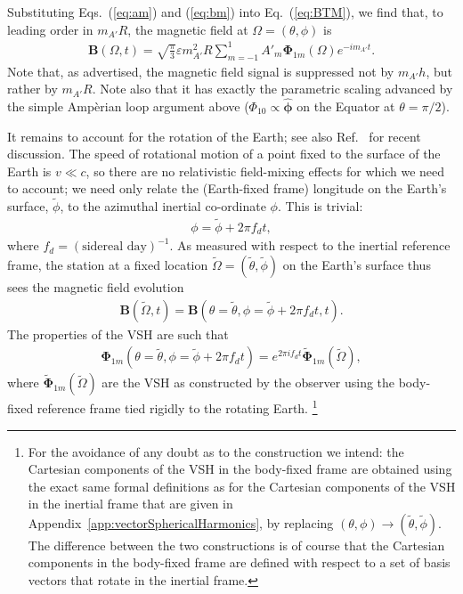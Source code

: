 \documentclass[amsmath,amssymb,aps,10pt,prd,letterpaper,nofootinbib,balancelastpage,notitlepage,superscriptaddress,twocolumn,floatfix]{revtex4-2}
\newcommand{\appref}[2][x]{Appendi{#1}~\ref{#2}}	%
\renewcommand{\eqref}[2][]{Eq{#1}.~(\ref{eq:#2})}	%
\newcommand{\citeR}[2][]{Ref{#1}.~\cite{#2}}		%
\newcommand{\phihat}{\bm{\hat{\phi}}}
\begin{document}
Substituting \eqref[s]{am} and (\ref{eq:bm}) into \eqref{BTM}, we find that, to leading order in $m_{A'}R$, the magnetic field at $\Omega=(\theta,\phi)$ is
\begin{align}
    \bm{B}(\Omega,t)=\sqrt{\frac\pi3}\varepsilon m_{A'}^2R\sum_{m=-1}^1A'_m\bm{\Phi}_{1m}(\Omega)e^{-im_{A'}t}.
    \label{eq:pre_signal}
\end{align}
Note that, as advertised, the magnetic field signal is suppressed not by $m_{A'}h$, but rather by $m_{A'}R$.
Note also that it has exactly the parametric scaling advanced by the simple Amp\`erian loop argument above ($\Phi_{10}\propto \phihat$ on the Equator at $\theta =\pi/2$).

It remains to account for the rotation of the Earth; see also \citeR{Caputo:2021eaa} for recent discussion.
The speed of rotational motion of a point fixed to the surface of the Earth is $v \ll c$, so there are no relativistic field-mixing effects for which we need to account; we need only relate the (Earth-fixed frame) longitude on the Earth's surface, $\tilde{\phi}$, to the azimuthal inertial co-ordinate $\phi$.
This is trivial:
\begin{align}
    \phi=\tilde\phi+2\pi f_dt,
    \label{eq:phaseRot}
\end{align}
where $f_d = (\text{sidereal day})^{-1}$.
As measured with respect to the inertial reference frame, the station at a fixed location $\tilde{\Omega} = (\tilde{\theta},\tilde{\phi})$ on the Earth's surface thus sees the magnetic field evolution
\begin{align}
    \bm{B}(\tilde{\Omega},t) = \bm{B}(\theta = \tilde{\theta},\phi=\tilde{\phi}+2\pi f_d t,t).
    \label{eq:Bevol}
\end{align}
The properties of the VSH are such that
\begin{align}
\bm{\Phi}_{1m}(\theta=\tilde{\theta},\phi=\tilde{\phi}+2\pi f_d t) = e^{2\pi if_dt} \bm{\tilde{\Phi}}_{1m}(\tilde{\Omega}),
\end{align}
where $\bm{\tilde{\Phi}}_{1m}(\tilde{\Omega})$ are the VSH as constructed by the observer using the body-fixed reference frame tied rigidly to the rotating Earth.%
\footnote{\label{ftnt:frames}%
    For the avoidance of any doubt as to the construction we intend: the Cartesian components of the VSH in the body-fixed frame are obtained using the exact same formal definitions as for the Cartesian components of the VSH in the inertial frame that are given in \appref{app:vectorSphericalHarmonics}, by replacing $ (\theta,\phi) \rightarrow  (\tilde{\theta},\tilde{\phi})$.
    The difference between the two constructions is of course that the Cartesian components in the body-fixed frame are defined with respect to a set of basis vectors that rotate in the inertial frame.
} %
\end{document}
